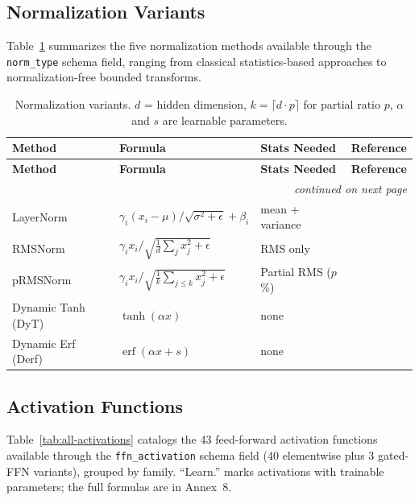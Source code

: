 \subsection{Normalization Variants}

Table~\ref{tab:all-norms} summarizes the five normalization methods available through the \texttt{norm\_type} schema field, ranging from classical statistics-based approaches to normalization-free bounded transforms.

\small
\begin{longtable}{p{2.5cm}p{5.5cm}p{2.5cm}p{3.5cm}}
\toprule
\textbf{Method} & \textbf{Formula} & \textbf{Stats Needed} & \textbf{Reference} \\
\midrule
\endfirsthead
\toprule
\textbf{Method} & \textbf{Formula} & \textbf{Stats Needed} & \textbf{Reference} \\
\midrule
\endhead
\midrule
\multicolumn{4}{r}{\textit{continued on next page}} \\
\endfoot
\bottomrule
\caption{Normalization variants. $d$ = hidden dimension, $k = \lceil d \cdot p \rceil$ for partial ratio $p$, $\alpha$ and $s$ are learnable parameters.}
\label{tab:all-norms}
\endlastfoot
LayerNorm & $\gamma_i (x_i - \mu)/\sqrt{\sigma^2 + \epsilon} + \beta_i$ & mean + variance & \citep{ba2016layer} \\
RMSNorm & $\gamma_i x_i / \sqrt{\frac{1}{d}\sum_j x_j^2 + \epsilon}$ & RMS only & \citep{zhang_root_2019} \\
pRMSNorm & $\gamma_i x_i / \sqrt{\frac{1}{k}\sum_{j \le k} x_j^2 + \epsilon}$ & Partial RMS ($p$\,\%) & \citep{zhang_root_2019} \\
Dynamic Tanh (DyT) & $\tanh(\alpha x)$ & none & \citep{zhu_transformers_2025} \\
Dynamic Erf (Derf) & $\operatorname{erf}(\alpha x + s)$ & none & \citep{chen_stronger_2025} \\
\bottomrule
\end{longtable}
\normalsize

\subsection{Activation Functions}

Table~\ref{tab:all-activations} catalogs the 43 feed-forward activation functions available through the \texttt{ffn\_activation} schema field (40 elementwise plus 3 gated-FFN variants), grouped by family. ``Learn.'' marks activations with trainable parameters; the full formulas are in Annex~8.

